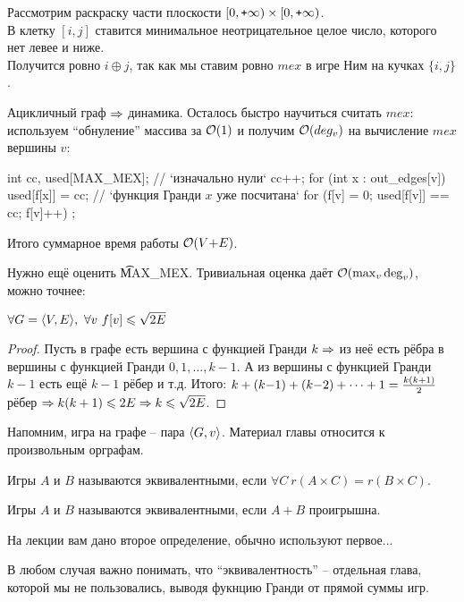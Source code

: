 \begin{Rem}
Рассмотрим раскраску части плоскости $[0,\texttt{+}\infty) \times [0,\texttt{+}\infty)$. \\
В клетку $[i,j]$ ставится минимальное неотрицательное целое число, которого нет левее и ниже.\\
Получится ровно $i \oplus j$, так как мы ставим ровно $mex$ в игре Ним на кучках $\{i, j\}$.
\end{Rem}

\up
{}

Ацикличный граф $\Rightarrow$ динамика.
Осталось быстро научиться считать $mex$: \\
используем ``обнуление'' массива за $\mathcal{O}(1)$ и получим $\mathcal{O}(deg_v)$ на вычисление $mex$ вершины $v$:
\begin{code}
int cc, used[MAX_MEX]; // `изначально нули`
cc++;
for (int x : out_edges[v])
	used[f[x]] = cc; // `функция Гранди $x$ уже посчитана`
for (f[v] = 0; used[f[v]] == cc; f[v]++)
	;
\end{code}
Итого суммарное время работы $\mathcal{O}(V{+}E)$.

Нужно ещё оценить \t{MAX\_MEX}. Тривиальная оценка даёт $\mathcal{O}(\max_v \deg_v)$, можно точнее:
\begin{Lm} 
$\forall G = \langle V, E \rangle,\ \forall v\ f[v] \leqslant \sqrt{2E}$
\end{Lm}
\begin{proof}
Пусть в графе есть вершина с функцией Гранди $k \Rightarrow$ из неё есть рёбра в вершины с функцией Гранди $0, 1, \dots, k{-}1$. А из вершины с функцией Гранди $k{-}1$ есть ещё $k{-}1$ рёбер и т.д.
Итого: $k+(k{-}1)+(k{-}2)+\dots+1 = {\textstyle\frac{k(k+1)}{2}}$ рёбер $\Rightarrow k(k+1) \leqslant 2E \Rightarrow k \leqslant \sqrt{2E}$.
\end{proof}

\up
{}

Напомним, игра на графе -- пара $\langle G,v \rangle$. 
Материал главы относится к произвольным орграфам.

\begin{Def}
Игры $A$ и $B$ называются эквивалентными, если $\forall C\ r(A \times C) = r(B \times C)$.
\end{Def}

\begin{Def}
Игры $A$ и $B$ называются эквивалентными, если $A + B$ проигрышна.
\end{Def}

На лекции вам дано второе определение, обычно используют первое... 

В любом случая важно понимать, что ``эквивалентность'' -- отдельная глава, которой мы не пользовались, выводя 
фукнцию Гранди от прямой суммы игр.

\down
\TODO


